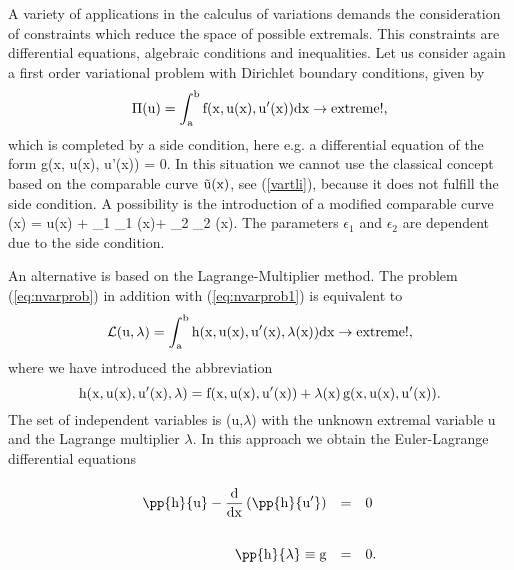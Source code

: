 A variety of applications in the calculus of variations demands the 
consideration of constraints which reduce the space of possible extremals.
This constraints are differential equations,
algebraic conditions and inequalities.
Let us consider again a first order variational problem 
with Dirichlet boundary conditions, given by 
\begin{equation}
\rm
\Pi(u) = \displaystyle \int_a^b f(x, u(x), u'(x)) dx \rightarrow extreme!,
\label{eq:nvarprob}
\end{equation}
which is completed by a side condition, here e.g. a differential equation
of the form
\eb
\rm
g(x, u(x), u'(x)) = 0.
\label{eq:nvarprob1}
\ee
In this situation we cannot use the classical concept based on the 
comparable curve $\rm \tilde u(x)$, see (\ref{vartli}), because it does 
not fulfill the side condition. A possibility is the introduction of 
a modified comparable curve 
\ebn
\rm
{}(x) = u(x) + \epsilon_1 \eta_1 (x)+ \epsilon_2 \eta_2 (x).
\een
The parameters $\epsilon_1$ and $\epsilon_2$ are dependent 
due to the side condition.

An alternative is based on the Lagrange-Multiplier method. 
The problem (\ref{eq:nvarprob}) in addition with (\ref{eq:nvarprob1}) 
is equivalent to 
\begin{equation}
\rm
\mathcal{L}(u, \lambda) = \int_a^b h(x, u(x), u'(x), \lambda (x)) dx
\rightarrow extreme!  ,
\end{equation}
where we have introduced the abbreviation 
\begin{equation}
\rm
h(x, u(x), u'(x), \lambda) = f(x, u(x), u'(x)) 
                           + \lambda(x) \, g(x, u(x), u'(x)).
\end{equation}
The set of independent variables is (u,$\lambda$) with the unknown
extremal variable u and the Lagrange multiplier $\lambda$. 
In this approach we obtain the 
Euler-Lagrange differential equations
\begin{equation} 
\renewcommand{\arraystretch}{2.5}
\begin{array}{rcl}
\displaystyle 
\rm
\pp{h}{u} - \dfrac{d}{dx} \left( \pp{h}{u'} \right) & = &0 
\\ [1.6ex]
\displaystyle
\rm 
\pp{h}{\lambda} \equiv g & = & 0 .
\end{array}
\end{equation}


